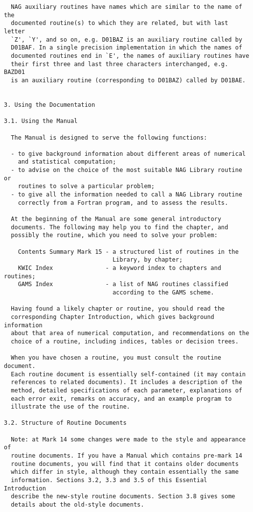 \begin{verbatim}
  NAG auxiliary routines have names which are similar to the name of the
  documented routine(s) to which they are related, but with last letter
  `Z', `Y', and so on, e.g. D01BAZ is an auxiliary routine called by
  D01BAF. In a single precision implementation in which the names of
  documented routines end in `E', the names of auxiliary routines have
  their first three and last three characters interchanged, e.g. BAZD01
  is an auxiliary routine (corresponding to D01BAZ) called by D01BAE.
 
 
3. Using the Documentation
 
3.1. Using the Manual
 
  The Manual is designed to serve the following functions:
 
  - to give background information about different areas of numerical
    and statistical computation;
  - to advise on the choice of the most suitable NAG Library routine or
    routines to solve a particular problem;
  - to give all the information needed to call a NAG Library routine
    correctly from a Fortran program, and to assess the results.
 
  At the beginning of the Manual are some general introductory
  documents. The following may help you to find the chapter, and
  possibly the routine, which you need to solve your problem:
 
    Contents Summary Mark 15 - a structured list of routines in the
                               Library, by chapter;
    KWIC Index               - a keyword index to chapters and routines;
    GAMS Index               - a list of NAG routines classified
                               according to the GAMS scheme.
 
  Having found a likely chapter or routine, you should read the
  corresponding Chapter Introduction, which gives background information
  about that area of numerical computation, and recommendations on the
  choice of a routine, including indices, tables or decision trees.
 
  When you have chosen a routine, you must consult the routine document.
  Each routine document is essentially self-contained (it may contain
  references to related documents). It includes a description of the
  method, detailed specifications of each parameter, explanations of
  each error exit, remarks on accuracy, and an example program to
  illustrate the use of the routine.
 
3.2. Structure of Routine Documents
 
  Note: at Mark 14 some changes were made to the style and appearance of
  routine documents. If you have a Manual which contains pre-mark 14
  routine documents, you will find that it contains older documents
  which differ in style, although they contain essentially the same
  information. Sections 3.2, 3.3 and 3.5 of this Essential Introduction
  describe the new-style routine documents. Section 3.8 gives some
  details about the old-style documents.
 

\end{verbatim}
